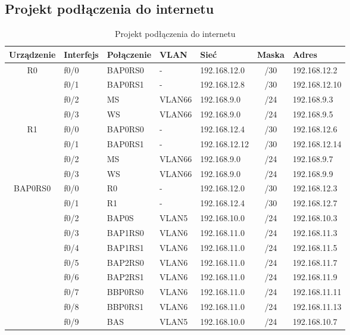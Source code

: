 \documentclass[12pt,a4paper,titlepage]{article}
\begin{document}
\newpage
\subsection{Projekt podłączenia do internetu}
    {\centering
    \small
    \begin{longtable}{|c|l|l|l|l|c|l|}
    \caption{Projekt podłączenia do internetu} \\
    \hline
    \textbf{Urządzenie} & \textbf{Interfejs} & \textbf{Połączenie} & \textbf{VLAN} & \textbf{Sieć} & \textbf{Maska} & \textbf{Adres} \\
    \hline
    \multirow{4}{*}{R0}
    & f0/0 & BAP0RS0 & - & 192.168.12.0 & /30 & 192.168.12.2 \\
    \cline{2-7}
    & f0/1 & BAP0RS1 & - & 192.168.12.8 & /30 & 192.168.12.10
 \\
    \cline{2-7}
    & f0/2 & MS & VLAN66 & 192.168.9.0 & /24 & 192.168.9.3
 \\
    \cline{2-7}
    & f0/3 & WS & VLAN66 & 192.168.9.0 & /24 & 192.168.9.5
 \\
    \hline
    
    \multirow{4}{*}{R1}
    & f0/0 & BAP0RS0 & - & 192.168.12.4 & /30 & 192.168.12.6
 \\
    \cline{2-7}
    & f0/1 & BAP0RS1 & - & 192.168.12.12 & /30 & 192.168.12.14
 \\
    \cline{2-7}
    & f0/2 & MS & VLAN66 & 192.168.9.0 & /24 & 192.168.9.7
 \\
    \cline{2-7}
    & f0/3 & WS & VLAN66 & 192.168.9.0 & /24 & 192.168.9.9
 \\
    \hline
    
    \multirow{10}{*}{BAP0RS0}
    & f0/0 & R0      & - & 192.168.12.0 & /30 & 192.168.12.3
 \\
    \cline{2-7}
    & f0/1 & R1      & - & 192.168.12.4 & /30 & 192.168.12.7
 \\
    \cline{2-7}
    & f0/2 & BAP0S   & VLAN5 & 192.168.10.0 & /24 & 192.168.10.3
 \\
    \cline{2-7}
    & f0/3 & BAP1RS0 & VLAN6  & 192.168.11.0 & /24 & 192.168.11.3
 \\
    \cline{2-7}
    & f0/4 & BAP1RS1 & VLAN6  & 192.168.11.0 & /24 & 192.168.11.5
 \\
    \cline{2-7}
    & f0/5 & BAP2RS0 & VLAN6  & 192.168.11.0 & /24 & 192.168.11.7
 \\
    \cline{2-7}
    & f0/6 & BAP2RS1 & VLAN6  & 192.168.11.0 & /24 & 192.168.11.9
 \\
    \cline{2-7}
    & f0/7 & BBP0RS0 & VLAN6  & 192.168.11.0 & /24 & 192.168.11.11
 \\
    \cline{2-7}
    & f0/8 & BBP0RS1 & VLAN6  & 192.168.11.0 & /24 & 192.168.11.13
 \\
    \cline{2-7}
    & f0/9 & BAS     & VLAN5 & 192.168.10.0 & /24 & 192.168.10.7
 \\
    \hline
    

\end{longtable}}
\end{document}
